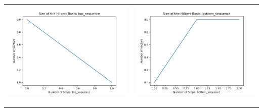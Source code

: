 \documentclass[10pt]{article}
\begin{document}
\begin{tabular}{c|c}
\begin{minipage}{.45\textwidth}
\includegraphics[width=\textwidth]{"DATA/5d/6 generators 1 bound F/top_sequence SIZE"}
\end{minipage} &
\begin{minipage}{.45\textwidth}
\includegraphics[width=\textwidth]{"DATA/5d/6 generators 1 bound F bottomup/bottom_sequence SIZE"}
\end{minipage} \\ \\
\hline \\\begin{minipage}{.45\textwidth}

\end{minipage}
\end{tabular}
\end{document}
